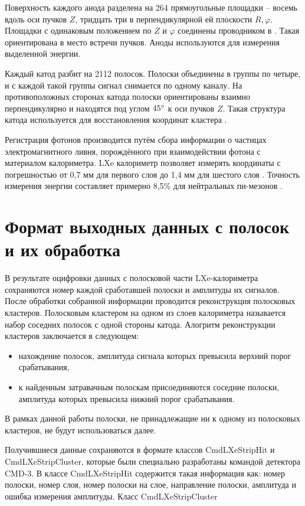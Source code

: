 \documentclass[14pt]{extarticle}
\begin{document}
Поверхность каждого анода разделена на 264 прямоугольные площадки -- восемь вдоль оси пучков $Z$, тридцать три в перпендикулярной ей плоскости $R,\varphi$. Площадки с одинаковым положением по $Z$ и $\varphi$ соединены проводником в . Такая  ориентирована в место встречи пучков. Аноды используются для измерения выделенной энергии.

Каждый катод разбит на 2112 полосок. Полоски объединены в группы по четыре, и с каждой такой группы сигнал снимается по одному каналу. На противоположных сторонах катода полоски ориентированы взаимно перпендикулярно и находятся под углом $45\degree$ к оси пучков $Z$. Такая структура катода используется для восстановления координат кластера \cite{shebalin}.

Регистрация фотонов производится путём сбора информации о частицах электромагнитного ливня, порождённого при взаимодействии фотона с материалом калориметра. LXe калориметр позволяет измерять координаты с погрешностью от 0,7 мм для первого слоя до 1,4 мм для шестого слоя \cite{Epifanov_2011,lxe_2009}. Точность измерения энергии составляет примерно 8,5\% для нейтральных пи-мезонов \cite{Anisenkov_2014}.

\section{Формат выходных данных с полосок и их обработка}
В результате оцифровки данных с полосковой части LXe-калориметра сохраняются номер каждой сработавшей полоски и амплитуды их сигналов. После обработки собранной информации проводится реконструкция полосковых кластеров. Полосковым кластером на одном из слоев калориметра называется набор соседних полосок с одной стороны катода. Алогритм реконструкции кластеров заключается в следующем:
\begin{itemize}
    \item нахождение полосок, амплитуда сигнала которых превысила верхний порог срабатывания,
    \item к найденным затравачным полоскам присоединяются соседние полоски, амплитуда которых превысила нижний порог срабатывания.
\end{itemize}
В рамках данной работы полоски, не принадлежащие ни к одному из полосковых кластеров, не будут использоваться далее.

Получившиеся данные сохраняются в формате классов CmdLXeStripHit и CmdLXeStripCluster, которые были специально разработаны командой детектора CMD-3. В классе CmdLXeStripHit содержится такая информация как: номер полоски, номер слоя, номер полоски на слое, направление полоски, амплитуда и ошибка измерения амплитуды. Класс CmdLXeStripCluster 
\end{document}
